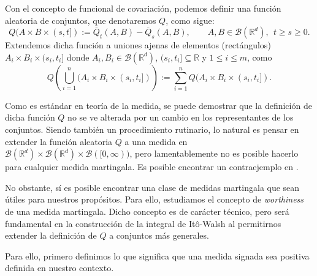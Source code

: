 \documentclass[letterpaper,twoside,12pt]{book}
\newcommand{\R}{\mathbb{R}}
\newcommand{\B}{\mathcal{B}}
\newcommand{\1}{\mathds{1}}
\theoremstyle{definition}
\theoremstyle{definition}
\theoremstyle{remark}
\theoremstyle{definition}
\theoremstyle{definition}
\theoremstyle{definition}
\theoremstyle{definition}
\theoremstyle{definition}
\begin{document}
Con el concepto de funcional de covariación, podemos definir una función aleatoria de conjuntos, que denotaremos $Q$, como sigue:
\[
   Q(A\times B\times(s,t]):=\overline{Q}_t(A,B)-\overline{Q}_s(A,B), \qquad A,B\in \B(\R^{d}), \ \ t\geq s\geq 0.
   \]
Extendemos dicha función a uniones ajenas de elementos (rectángulos)
$A_i\times B_i\times(s_i,t_i]$ donde $A_i,B_i\in \B(\R^{d})$, $(s_i,t_i]\subseteq \R$  y $1\leq i \leq m$, como 
\[
Q \left(\bigcup_{i=1}^{n}(A_i\times B_i\times(s_i,t_i])\right):=\sum_{i=1}^{n}Q(A_i\times B_i\times (s_i,t_i]).
\]
  
Como es estándar en teoría de la medida, se puede demostrar que la definición de dicha función $Q$ no se ve alterada por un cambio en los representantes de los conjuntos. Siendo también un procedimiento rutinario, lo natural es pensar en extender la función aleatoria $Q$ a una medida en $\B(\R^{d})\times \B(\R^{d})\times \B([0,\infty))$, pero lamentablemente no es posible hacerlo para cualquier medida martingala. Es posible encontrar un contraejemplo en \cite[pp. 305 - 307]{Walsh_J.B_Introduction_to_SPDEs}. 

No obstante, sí es posible encontrar una clase de medidas martingala que sean útiles para nuestros propósitos. Para ello, estudiamos el concepto de \textit{worthiness} de una medida martingala. Dicho concepto es de carácter técnico, pero será fundamental en la construcción de la integral de Itô-Walsh al permitirnos extender la definición de $Q$ a conjuntos más generales.

Para ello, primero definimos lo que significa que una medida signada sea positiva definida en nuestro contexto.
\end{document}
